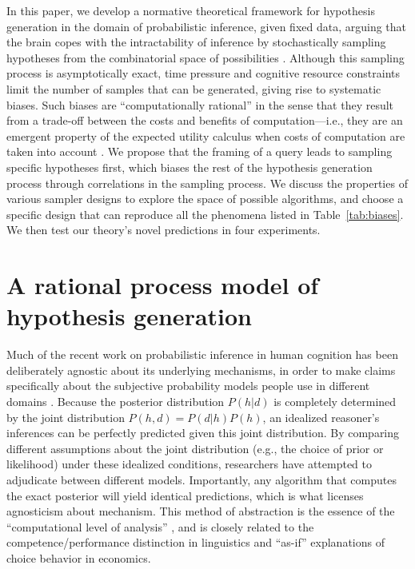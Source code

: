 In this paper, we develop a normative theoretical framework for hypothesis generation in the domain of probabilistic inference, given fixed data, arguing that the brain copes with the intractability of inference by stochastically sampling hypotheses from the combinatorial space of possibilities \citep[see also][]{sanborn16}. Although this sampling process is asymptotically exact, time pressure and cognitive resource constraints limit the number of samples that can be generated, giving rise to systematic biases. Such biases are ``computationally rational'' in the sense that they result from a trade-off between the costs and benefits of computation---i.e., they are an emergent property of the expected utility calculus when costs of computation are taken into account \citep{Gershman2015,Vul2014,lieder2017anchoring}.
We propose that the framing of a query leads to sampling specific hypotheses first, which biases the rest of the hypothesis generation process through correlations in the sampling process.
We discuss the properties of various sampler designs to explore the space of possible algorithms, and choose a specific design that can reproduce all the phenomena listed in Table~\ref{tab:biases}. We then test our theory's novel predictions in four experiments.

\section{A rational process model of hypothesis generation}

Much of the recent work on probabilistic inference in human cognition has been deliberately agnostic about its underlying mechanisms, in order to make claims specifically about the subjective probability models people use in different domains \citep{chater2006}. Because the posterior distribution $P(h|d)$ is completely determined by the joint distribution $P(h,d) = P(d|h)P(h)$, an idealized reasoner's inferences can be perfectly predicted given this joint distribution. By comparing different assumptions about the joint distribution (e.g., the choice of prior or likelihood) under these idealized conditions, researchers have attempted to adjudicate between different models. Importantly, any algorithm that computes the exact posterior will yield identical predictions, which is what licenses agnosticism about mechanism. This method of abstraction is the essence of the ``computational level of analysis'' \citep{marr1976understanding}, and is closely related to the competence/performance distinction in linguistics and ``as-if'' explanations of choice behavior in economics.

